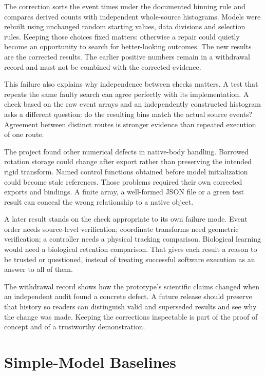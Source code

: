 The correction sorts the event times under the documented binning rule and compares derived counts with independent whole-source histograms. Models were rebuilt using unchanged random starting values, data divisions and selection rules. Keeping those choices fixed matters: otherwise a repair could quietly become an opportunity to search for better-looking outcomes. The new results are the corrected results. The earlier positive numbers remain in a withdrawal record and must not be combined with the corrected evidence.

This failure also explains why independence between checks matters. A test that repeats the same faulty search can agree perfectly with its implementation. A check based on the raw event arrays and an independently constructed histogram asks a different question: do the resulting bins match the actual source events? Agreement between distinct routes is stronger evidence than repeated execution of one route.

The project found other numerical defects in native-body handling. Borrowed rotation storage could change after export rather than preserving the intended rigid transform. Named control functions obtained before model initialization could become stale references. Those problems required their own corrected exports and bindings. A finite array, a well-formed JSON file or a green test result can conceal the wrong relationship to a native object.

A later result stands on the check appropriate to its own failure mode. Event order needs source-level verification; coordinate transforms need geometric verification; a controller needs a physical tracking comparison. Biological learning would need a biological retention comparison. That gives each result a reason to be trusted or questioned, instead of treating successful software execution as an answer to all of them.

The withdrawal record shows how the prototype's scientific claims changed when an independent audit found a concrete defect. A future release should preserve that history so readers can distinguish valid and superseded results and see why the change was made. Keeping the corrections inspectable is part of the proof of concept and of a trustworthy demonstration.

\section{Simple-Model Baselines}

